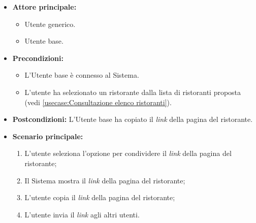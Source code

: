 \label{usecase:Condivisione link del ristorante}
\begin{itemize}
    \item \textbf{Attore principale:}    
	\begin{itemize}
        \item Utente generico.
        \item Utente base.
    \end{itemize}

	\item \textbf{Precondizioni:}
	\begin{itemize}
		\item L'Utente base è connesso al Sistema.
		\item L'utente ha selezionato un ristorante dalla lista di ristoranti proposta (vedi \autoref{usecase:Consultazione elenco ristoranti}).
	\end{itemize}

	\item \textbf{Postcondizioni:}
	      L'Utente base ha copiato il \textit{link} della pagina del ristorante.

	\item \textbf{Scenario principale:}
	      \begin{enumerate}
		      \item L'utente seleziona l'opzione per condividere il \textit{link} della pagina del ristorante;
		      \item Il Sistema mostra il \textit{link} della pagina del ristorante;
		      \item L'utente copia il \textit{link} della pagina del ristorante;
		      \item L'utente invia il \textit{link} agli altri utenti.
	      \end{enumerate}
\end{itemize}